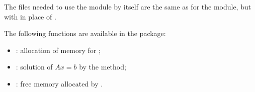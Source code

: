 The files needed to use the {\sptfqmr} module by itself are the same as for the
{\spgmr} module, but with  in place of
.

The following functions are available in the {\sptfqmr} package:  
\begin{itemize}
\item {}: allocation of memory for ;
\item {}: solution of $Ax = b$ by the {\sptfqmr} method;
\item {}: free memory allocated by .
\end{itemize}
